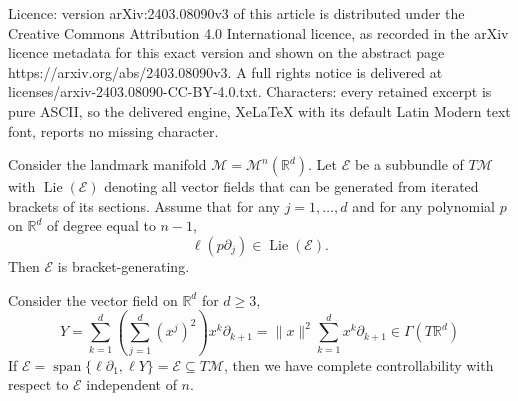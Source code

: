 \documentclass[10pt,a4paper]{amsart}
\DeclareMathOperator{\Lie}{Lie}
\DeclareMathOperator{\spn}{span}
\newcommand{\E}{\mathcal{E}}
\newcommand{\LM}{\mathcal{M}}
\newcommand{\R}{\mathbb{R}}
\newcommand{\s}[1]{\Gamma(#1)}
\begin{document}
Licence: version arXiv:2403.08090v3 of this article is distributed under the Creative Commons Attribution 4.0 International licence, as recorded in the arXiv licence metadata for this exact version and shown on the abstract page https://arxiv.org/abs/2403.08090v3. A full rights notice is delivered at licenses/arxiv-2403.08090-CC-BY-4.0.txt. Characters: every retained excerpt is pure ASCII, so the delivered engine, XeLaTeX with its default Latin Modern text font, reports no missing character.
\begin{lemma} \label{lemma:polynomials} Consider the landmark manifold $\LM = \LM^n(\mathbb{R}^d)$.
Let $\E$ be a subbundle of $T\LM$ with $\Lie(\E)$ denoting all vector fields that can be generated from iterated brackets of its sections. Assume that for any $j=1,\dots, d$ and for any polynomial $p$ on $\mathbb{R}^d$ of degree equal to $n-1$,
$$\ell (p \partial_j) \in \Lie(\E).$$
Then $\E$ is bracket-generating.
\end{lemma}

\begin{theorem} \label{th:Higher}
Consider the vector field on $\mathbb{R}^d$ for $d \geq 3$,
\begin{equation}
Y = \sum_{k=1}^d \left( \sum_{j=1}^d (x^j)^2 \right) x^k \partial_{k+1} =\| x\|^2 \sum_{k=1}^d  x^k \partial_{k+1} \in \s{T\R^d}
\end{equation}
If $\E= \spn \{ \ell \partial_1, \ell Y\} = \E \subseteq T\LM$,
then we have complete controllability with respect to $\E$ independent of $n$.
\end{theorem}
\end{document}
